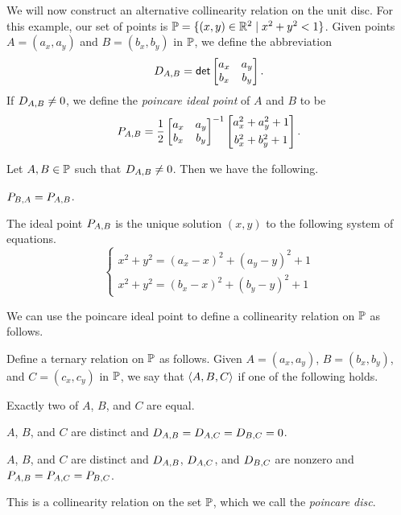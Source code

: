 We will now construct an alternative collinearity relation on the unit disc.
For this example, our set of points is \( \mathbb{P} = \{ (x,y) \in \mathbb{R}^2 \mid x^2 + y^2 < 1 \}\).
Given points \(A = (a_x, a_y)\) and \(B = (b_x, b_y)\) in \(\mathbb{P}\), we define the abbreviation \[ D_{A,B} = \mathsf{det} \begin{bmatrix} a_x & a_y \\ b_x & b_y \end{bmatrix}. \]
If \(D_{A,B} \neq 0\), we define the \emph{poincare ideal point} of \(A\) and \(B\) to be \[ P_{A,B} = \frac{1}{2} \begin{bmatrix} a_x & a_y \\ b_x & b_y \end{bmatrix}^{-1} \begin{bmatrix} a_x^2 + a_y^2 + 1 \\[4pt] b_x^2 + b_y^2 + 1 \end{bmatrix}. \]

\begin{lem}\label{lem:pd-ideal-point}
Let \(A,B \in \mathbb{P}\) such that \(D_{A,B} \neq 0\).
Then we have the following.
\begin{proplist}
\item \label{lem:pd-ideal-point:sym} \(P_{B,A} = P_{A,B}\).
\item \label{lem:pd-ideal-point:eq} The ideal point \(P_{A,B}\) is the unique solution \((x,y)\) to the following system of equations.
\[ \left\{ \begin{array}{l} x^2 + y^2 = (a_x - x)^2 + (a_y - y)^2 + 1 \\[4pt] x^2 + y^2 = (b_x - x)^2 + (b_y - y)^2 + 1 \end{array} \right. \]
\end{proplist}
\end{lem}

We can use the poincare ideal point to define a collinearity relation on \(\mathbb{P}\) as follows.

\begin{prop}
Define a ternary relation on \(\mathbb{P}\) as follows.
Given \(A = (a_x,a_y)\), \(B = (b_x, b_y)\), and \(C = (c_x, c_y)\) in \(\mathbb{P}\), we say that \(\langle A, B, C \rangle\) if one of the following holds.
\begin{proplist}
\item Exactly two of \(A\), \(B\), and \(C\) are equal.
\item \(A\), \(B\), and \(C\) are distinct and \(D_{A,B} = D_{A,C} = D_{B,C} = 0\).
\item \(A\), \(B\), and \(C\) are distinct and \(D_{A,B}\), \(D_{A,C}\), and \(D_{B,C}\) are nonzero and \(P_{A,B} = P_{A,C} = P_{B,C}\).
\end{proplist}
This is a collinearity relation on the set \(\mathbb{P}\), which we call the \emph{poincare disc}.
\end{prop}

